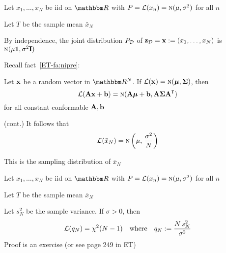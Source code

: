 \begin{frame}

    \vspace{2em}
    \Eg
    Let $x_1,\ldots,x_N$ be {\sc iid} on $\RR$ with $P = \mathcal L(x_n) = \textrm{\sc n}(\mu,
    \sigma^2)$ for all $n$
    
    Let $T$ be the sample mean $\bar x_N$
    
    By
    independence, the joint distribution $P_{\mathcal D}$ of $\mathbf{z}_{\mathcal D} =
    {\mathbf x} := (x_1,\ldots,x_N)$ is $\textrm{\sc n}(\mu {\mathbf 1}, \sigma^2 \mathbf I)$
    
    \vspace{.7em}
    Recall
    fact~\ref{ET-fa:nipre}:
    
    Let ${\mathbf x}$ be a random vector in $\RR^N$.  If $\mathcal L({\mathbf x}) = \textrm{\sc n}({\boldsymbol \mu}, {\boldsymbol \Sigma})$, then 
            \begin{equation*}
                  \lL(\boldA \boldx + \boldb) = \nN(\boldA \boldmu + \boldb, \boldA
                    \boldSigma \boldA^\T)  
            \end{equation*}
    for all constant conformable $\mathbf A, {\mathbf b}$
    
\end{frame}
    
\begin{frame}

    \vspace{2em}
    \Eg (cont.)
    It follows that
    \begin{equation*}
        \label{eq:sdsmnc}
        \mathcal L(\bar x_N) 
        = \textrm{\sc n} \left(\mu, \, \frac{\sigma^2}{N} \right)
    \end{equation*}
    
    \vspace{.7em}
    This is the sampling distribution of $\bar x_N$
    
\end{frame}

\begin{frame}

    \vspace{2em}
    \Eg
    Let $x_1,\ldots,x_N$ be {\sc iid} on $\RR$ with $P = \mathcal L(x_n) = \textrm{\sc n}(\mu,
    \sigma^2)$ for all $n$
    
    Let $T$ be the sample mean $\bar x_N$
    
    \vspace{.7em}
    Let $s_N^2$ be the sample variance.  If $\sigma >
    0$, then
    \begin{equation*}
        \label{eq:sdsmnc2}
        \mathcal L(q_N) = \chi^2(N - 1)
        \quad \text{where} \quad
        q_N := \frac{N \, s^2_N}{\sigma^2}
    \end{equation*}
    Proof is an exercise (or see page 249 in ET)
\end{frame}

